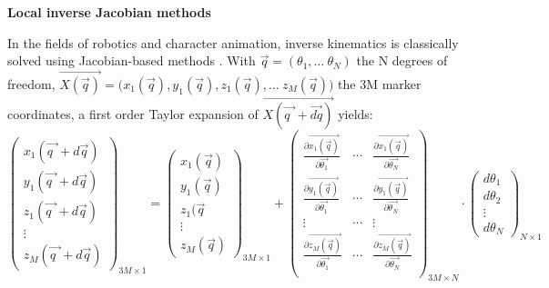 \vspace*{0.5cm}
\noindent\textbf{Local inverse Jacobian methods}

In the fields of robotics and character animation, inverse kinematics is classically solved using Jacobian-based methods \cite{Siciliano1990,Buss2009,Aristidou2018}. With $\overrightarrow{q}=(\theta_1, \dots \  \theta_N)$ the N degrees of freedom, $\overrightarrow{X(\overrightarrow{q})} = \bigl(x_1(\overrightarrow{q}), y_1(\overrightarrow{q}), z_1(\overrightarrow{q}), \dots \ z_M(\overrightarrow{q})\bigr)$ the 3M marker coordinates, a first order Taylor expansion of $\overrightarrow{X(\overrightarrow{q^{\ ^{\ }}}+\overrightarrow{dq})}$ yields:
\begin{equation}
    \begin{pmatrix}x_1(\overrightarrow{q^{\ ^{\ }}}+d\overrightarrow{q})\\ y_1(\overrightarrow{q^{\ ^{\ }}}+d\overrightarrow{q})\\ z_1(\overrightarrow{q^{\ ^{\ }}}+d\overrightarrow{q})\\ \vdots \\ z_M(\overrightarrow{q^{\ ^{\ }}}+d\overrightarrow{q})\end{pmatrix}_{3M \times 1}
    = \begin{pmatrix}x_1(\overrightarrow{q})\\ y_1(\overrightarrow{q})\\ z_1(\overrightarrow{q}\\ \vdots \\ z_M(\overrightarrow{q})\end{pmatrix}_{3M \times 1}
    + \begin{pmatrix}
        \frac{\partial{\overrightarrow{x_1(\overrightarrow{q})}}}{\partial{\overrightarrow{\theta_1}}} 
        & \cdots 
        & \frac{\partial{\overrightarrow{x_1(\overrightarrow{q})}}}{\partial{\overrightarrow{\theta_N}}} \\
        \frac{\partial{\overrightarrow{y_1(\overrightarrow{q})}}}{\partial{\overrightarrow{\theta_1}}} 
        & \cdots 
        & \frac{\partial{\overrightarrow{y_1(\overrightarrow{q})}}}{\partial{\overrightarrow{\theta_N}}} \\
        \vdots & \cdots & \vdots \\
        \frac{\partial{\overrightarrow{z_M(\overrightarrow{q})}}}{\partial{\overrightarrow{\theta_1}}} 
        & \cdots 
        & \frac{\partial{\overrightarrow{z_M(\overrightarrow{q})}}}{\partial{\overrightarrow{\theta_N}}} \\
    \end{pmatrix}_{3M\times N}
    \! \! \! \! \! \! \cdot \begin{pmatrix}d\theta_1\\ d\theta_2\\ \vdots \\ d\theta_N\end{pmatrix}_{N \times 1}
\end{equation}
